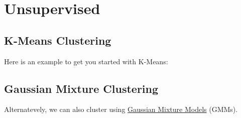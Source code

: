 \documentclass[]{book}
\newenvironment{Shaded}{\begin{snugshade}}{\end{snugshade}}
\newcommand{\CommentTok}[1]{\textcolor[rgb]{0.56,0.35,0.01}{\textit{#1}}}
\newcommand{\DataTypeTok}[1]{\textcolor[rgb]{0.13,0.29,0.53}{#1}}
\newcommand{\DecValTok}[1]{\textcolor[rgb]{0.00,0.00,0.81}{#1}}
\newcommand{\KeywordTok}[1]{\textcolor[rgb]{0.13,0.29,0.53}{\textbf{#1}}}
\newcommand{\NormalTok}[1]{#1}
\newcommand{\OperatorTok}[1]{\textcolor[rgb]{0.81,0.36,0.00}{\textbf{#1}}}
\newcommand{\OtherTok}[1]{\textcolor[rgb]{0.56,0.35,0.01}{#1}}
\newcommand{\StringTok}[1]{\textcolor[rgb]{0.31,0.60,0.02}{#1}}
\theoremstyle{definition}
\theoremstyle{definition}
\theoremstyle{definition}
\theoremstyle{remark}
\begin{document}
\hypertarget{unsupervised}{%
\section{Unsupervised}\label{unsupervised}}

\hypertarget{k-means-clustering}{%
\subsection{K-Means Clustering}\label{k-means-clustering}}

Here is an example to get you started with K-Means:

\begin{Shaded}
\end{Shaded}

\hypertarget{gaussian-mixture-clustering}{%
\subsection{Gaussian Mixture
Clustering}\label{gaussian-mixture-clustering}}

Alternatevely, we can also cluster using
\href{https://en.wikipedia.org/wiki/Mixture_model\#Gaussian_mixture_model}{Gaussian
Mixture Models} (GMMs).
\end{document}
